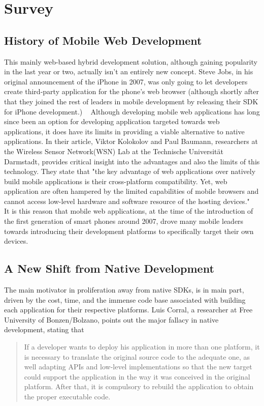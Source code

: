 \documentclass[11pt]{article}
\begin{document}
\section{Survey}
\subsection{History of Mobile Web Development}
\indent This mainly web-based hybrid development solution, although gaining popularity in the last year or two, actually isn't an entirely new concept.  Steve Jobs, in his original announcement of the iPhone in 2007, was only going to let developers create third-party application for the phone's web browser (although shortly after that they joined the rest of leaders in mobile development by releasing their SDK for iPhone development.) ~\cite{Mims2013}  Although developing mobile web applications has long since been an option for developing application targeted towards web applications, it does have its limits in providing a viable alternative to native applications.  In their article, Viktor Kolokolov and Paul Baumann, researchers at the Wireless Sensor Network(WSN) Lab at the Technische Universität Darmstadt, provides critical insight into the advantages and also the limits of this technology. They state that "the key advantage of web applications over natively build mobile applications is their cross-platform compatibility. Yet, web application are often hampered by the limited capabilities of mobile browsers and cannot access low-level hardware and software resource of the hosting devices." ~\cite{Kolokolov2013}  It is this reason that mobile web applications, at the time of the introduction of the first generation of smart phones around 2007, drove many mobile leaders towards introducing their development platforms to specifically target their own devices.

\subsection{A New Shift from Native Development}
The main motivator in proliferation away from native SDKs, is in main part, driven by the cost, time, and the immense code base associated with building each application for their respective platforms. Luis Corral, a researcher at Free University of Bonzen/Bolzano, points out the major fallacy in native development, stating that 

\begin{quote}
If a developer wants to deploy his application in more than one platform, it is necessary to translate the original source code to the adequate one, as well adapting APIs and low-level implementations so that the new target could support the application in the way it was conceived in the original platform.  After that, it is compulsory to rebuild the application to obtain the proper executable code. ~\cite{Corral2011}
\end{quote}
\end{document}
